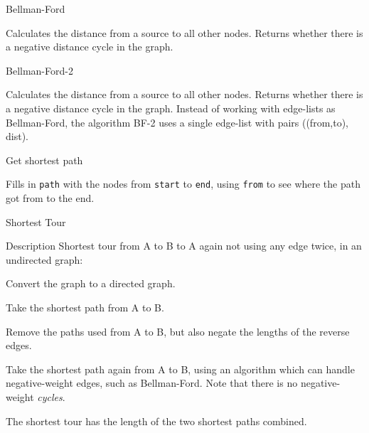 \begin{algorithm}{Bellman-Ford}

Calculates the distance from a source to all other nodes.
Returns whether there is a negative distance cycle in the graph.
\end{algorithm}

\begin{algorithm}{Bellman-Ford-2}

Calculates the distance from a source to all other nodes.
Returns whether there is a negative distance cycle in the graph.
Instead of working with edge-lists as Bellman-Ford, the algorithm BF-2 uses
a single edge-list with pairs ((from,to), dist).
\end{algorithm}

\begin{algorithm}{Get shortest path}

Fills in {\tt path} with the nodes from {\tt start} to {\tt end}, using
{\tt from} to see where the path got from to the end.
\end{algorithm}


\begin{algorithm}{Shortest Tour}
\item[Description]
Shortest tour from A to B to A again not using any edge twice, in an
undirected graph:

Convert the graph to a directed graph.

Take the shortest path from A to B.

Remove the paths used from A to B, but also negate the lengths of the
reverse edges.

Take the shortest path again from A to B, using an algorithm which can handle
negative-weight edges, such as Bellman-Ford. Note that there is no
negative-weight \emph{cycles}.

The shortest tour has the length of the two shortest paths combined.
\end{algorithm}
